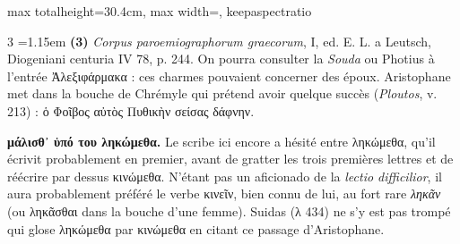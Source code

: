 \documentclass[11pt,twoside]{book}
\newcommand{\italique}[1]{\textit{#1}}
\newcommand{\grec}[1]{{\policeGr #1}}
\begin{document}
\begin{adjustbox}{max totalheight=30.4cm, max width=\textwidth, keepaspectratio}
\begin{minipage}{\textwidth}
{\begin{multicols}{3}
\noindent\hangindent=1.15em {\color{sepiaNote}\textbf{(3)}} \italique{Corpus paroemiographorum graecorum}, I, ed. E. L. a Leutsch, Diogeniani centuria IV 78, p. 244. On pourra consulter la \italique{Souda} ou Photius à l'entrée Ἀλεξιφάρμακα : ces charmes pouvaient concerner des époux. Aristophane met dans la bouche de Chrémyle qui prétend avoir quelque succès (\italique{Ploutos}, v. 213) : ὁ Φοῖβος αὐτὸς Πυθικὴν σείσας δάφνην.
\par\vspace{1.5pt}
 \textbf{μάλισθ᾽ ὑπό του ληκώμεθα.} Le scribe ici encore a hésité entre \grec{ληκώμεθα}, qu'il écrivit probablement en premier, avant de gratter les trois premières lettres et de réécrire par dessus \grec{κινώμεθα}. N'étant pas un aficionado de la \italique{lectio difficilior}, il aura probablement préféré le verbe \grec{κινεῖν}, bien connu de lui, au fort rare \italique{ληκᾶν} (ou \grec{ληκᾶσθαι} dans la bouche d'une femme). Suidas (λ 434) ne s'y est pas trompé qui glose ληκώμεθα par κινώμεθα en citant ce passage d'Aristophane.
\par\end{multicols}}
\end{minipage}\end{adjustbox}
\newpage
\end{document}
